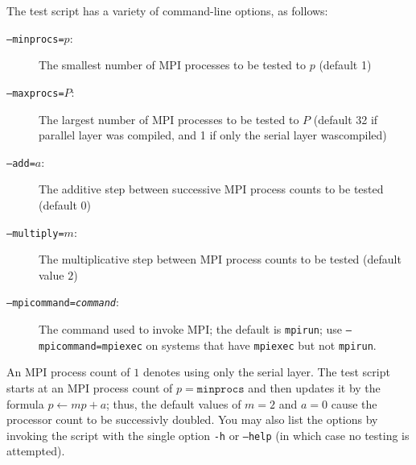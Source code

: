 The test script has a variety of command-line options, as follows:
\begin{description}
\item[\texttt{--minprocs=}$p$:] The smallest number of MPI processes to be
tested to $p$ (default 1)
\item[\texttt{--maxprocs=}$P$:] The largest number of MPI processes to be
tested to $P$ (default 32 if parallel layer was compiled, and 1 if only the
serial layer wascompiled)
\item[\texttt{--add=}$a$:] The additive step between successive MPI process
counts to be tested (default $0$)
\item[\texttt{--multiply=}$m$:] The multiplicative step between MPI process
counts to be tested (default value $2$)
\item[\texttt{--mpicommand=\emph{command}}:]  The command used to invoke MPI;
the default is \texttt{mpirun}; use \texttt{--mpicommand=mpiexec} on systems
that have \texttt{mpiexec} but not \texttt{mpirun}.
\end{description}
An MPI process count of $1$ denotes using only the serial layer.  The test
script starts at an MPI process count of $p = \mathtt{minprocs}$ and then
updates it by the formula $p \leftarrow mp + a$; thus, the default values of
$m=2$ and $a=0$ cause the processor count to be successivly doubled. You may
also list the options by invoking the script with the single option
\texttt{-h} or \texttt{--help} (in which case no testing is attempted).
